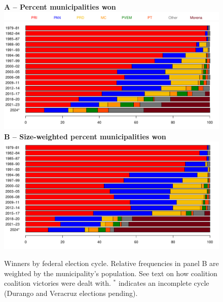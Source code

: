 \documentclass[letter,12pt]{article}
\begin{document}
\begin{figure}
  \centering
  \textbf{A -- Percent municipalities won} \\
  \includegraphics[width=.9\columnwidth]{../../plots/pctwin1979-2024-legend.pdf} \\
  \includegraphics[width=.9\columnwidth]{../../plots/pctwin1979-2024.pdf} \\
  \textbf{B -- Size-weighted percent municipalities won} \\
  \includegraphics[width=.9\columnwidth]{../../plots/pctwin-popw1979-2024.pdf}
  \caption{Winners by federal election cycle. Relative frequencies in panel B are weighted by the municipality's population. See text on how coalition coalition victories were dealt with. $^*$ indicates an incomplete cycle (Durango and Veracruz elections pending).}\label{F:win}
\end{figure}  
\end{document}
